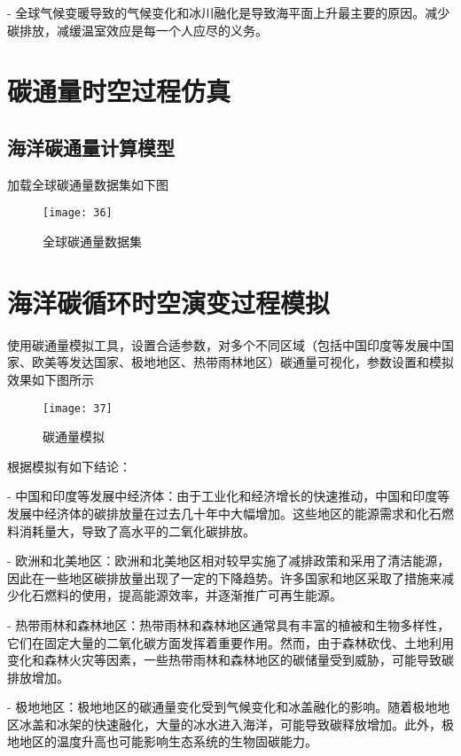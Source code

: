 \documentclass{source/Report}
\begin{document}
- 全球气候变暖导致的气候变化和冰川融化是导致海平面上升最主要的原因。减少碳排放，减缓温室效应是每一个人应尽的义务。

\section{碳通量时空过程仿真}

\subsection{海洋碳通量计算模型}

加载全球碳通量数据集如下图

\begin{figure}[H]
    \centering
    \texttt{[image: 36]}
    \caption{全球碳通量数据集}
\end{figure}

\section{海洋碳循环时空演变过程模拟}

使用碳通量模拟工具，设置合适参数，对多个不同区域（包括中国印度等发展中国家、欧美等发达国家、极地地区、热带雨林地区）碳通量可视化，参数设置和模拟效果如下图所示

\begin{figure}[H]
    \centering
    \texttt{[image: 37]}
    \caption{碳通量模拟}
\end{figure}

根据模拟有如下结论：

- 中国和印度等发展中经济体：由于工业化和经济增长的快速推动，中国和印度等发展中经济体的碳排放量在过去几十年中大幅增加。这些地区的能源需求和化石燃料消耗量大，导致了高水平的二氧化碳排放。

- 欧洲和北美地区：欧洲和北美地区相对较早实施了减排政策和采用了清洁能源，因此在一些地区碳排放量出现了一定的下降趋势。许多国家和地区采取了措施来减少化石燃料的使用，提高能源效率，并逐渐推广可再生能源。

- 热带雨林和森林地区：热带雨林和森林地区通常具有丰富的植被和生物多样性，它们在固定大量的二氧化碳方面发挥着重要作用。然而，由于森林砍伐、土地利用变化和森林火灾等因素，一些热带雨林和森林地区的碳储量受到威胁，可能导致碳排放增加。

- 极地地区：极地地区的碳通量变化受到气候变化和冰盖融化的影响。随着极地地区冰盖和冰架的快速融化，大量的冰水进入海洋，可能导致碳释放增加。此外，极地地区的温度升高也可能影响生态系统的生物固碳能力。
\end{document}
